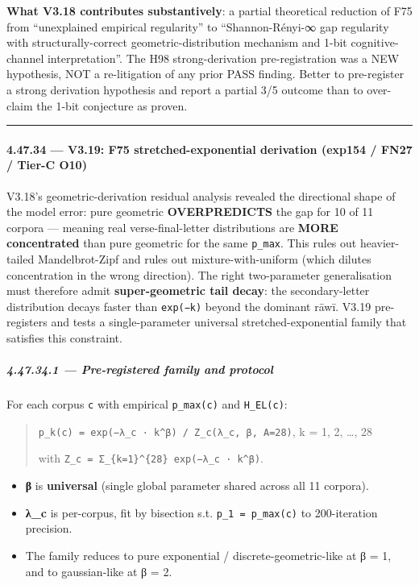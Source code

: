 \documentclass[
]{article}
\providecommand{\tightlist}{%
  \setlength{\itemsep}{0pt}\setlength{\parskip}{0pt}}
\begin{document}
\textbf{What V3.18 contributes substantively}: a partial theoretical
reduction of F75 from ``unexplained empirical regularity'' to
``Shannon-Rényi-∞ gap regularity with structurally-correct
geometric-distribution mechanism and 1-bit cognitive-channel
interpretation''. The H98 strong-derivation pre-registration was a NEW
hypothesis, NOT a re-litigation of any prior PASS finding. Better to
pre-register a strong derivation hypothesis and report a partial 3/5
outcome than to over-claim the 1-bit conjecture as proven.

\begin{center}\rule{0.5\linewidth}{0.5pt}\end{center}

\paragraph{4.47.34 --- V3.19: F75 stretched-exponential derivation
(exp154 / FN27 / Tier-C
O10)}\label{v3.19-f75-stretched-exponential-derivation-exp154-fn27-tier-c-o10}

V3.18's geometric-derivation residual analysis revealed the directional
shape of the model error: pure geometric \textbf{OVERPREDICTS} the gap
for 10 of 11 corpora --- meaning real verse-final-letter distributions
are \textbf{MORE concentrated} than pure geometric for the same
\texttt{p\_max}. This rules out heavier-tailed Mandelbrot-Zipf and rules
out mixture-with-uniform (which dilutes concentration in the wrong
direction). The right two-parameter generalisation must therefore admit
\textbf{super-geometric tail decay}: the secondary-letter distribution
decays faster than \texttt{exp(−k)} beyond the dominant rāwī. V3.19
pre-registers and tests a single-parameter universal
stretched-exponential family that satisfies this constraint.

\subparagraph{4.47.34.1 --- Pre-registered family and
protocol}\label{pre-registered-family-and-protocol}

For each corpus \texttt{c} with empirical \texttt{p\_max(c)} and
\texttt{H\_EL(c)}:

\begin{quote}
\texttt{p\_k(c)\ =\ exp(−λ\_c\ ·\ k\^{}β)\ /\ Z\_c(λ\_c,\ β,\ A=28)}, k
= 1, 2, \ldots, 28

with \texttt{Z\_c\ =\ Σ\_\{k=1\}\^{}\{28\}\ exp(−λ\_c\ ·\ k\^{}β)}.
\end{quote}

\begin{itemize}
\tightlist
\item
  \textbf{β} is \textbf{universal} (single global parameter shared
  across all 11 corpora).
\item
  \textbf{λ\_c} is per-corpus, fit by bisection s.t.
  \texttt{p\_1\ =\ p\_max(c)} to 200-iteration precision.
\item
  The family reduces to pure exponential / discrete-geometric-like at β
  = 1, and to gaussian-like at β = 2.
\end{itemize}
\end{document}
